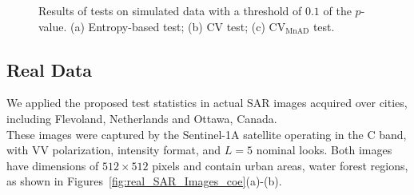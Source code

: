 \documentclass[remotesensing,article,submit,moreauthors,pdftex]{Definitions/mdpi}
\begin{document}
\begin{figure}[H]

{\centering {}

}

\caption{Results of tests on simulated data with a threshold of $0.1$ of the $p$-value. (a) Entropy-based test; (b) CV test; (c) $\text{CV}_{\text{MnAD}}$ test.}\label{fig:sim_SAR_Images_p05}
\end{figure}

\hypertarget{real-data}{%
\subsection{Real Data}\label{real-data}}

We applied the proposed test statistics in actual SAR images acquired
over cities, including Flevoland, Netherlands and Ottawa, Canada.\\
These images were captured by the Sentinel-1A satellite operating in the
C band, with VV polarization, intensity format, and \(L=5\) nominal
looks. Both images have dimensions of \(512 \times 512\) pixels and
contain urban areas, water forest regions, as shown in
Figures~\ref{fig:real_SAR_Images_coe}(a)-(b).
\end{document}
